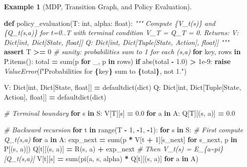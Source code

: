 \documentclass[
]{book}
\newenvironment{Shaded}{\begin{snugshade}}{\end{snugshade}}
\newcommand{\BuiltInTok}[1]{#1}
\newcommand{\CommentTok}[1]{\textcolor[rgb]{0.56,0.35,0.01}{\textit{#1}}}
\newcommand{\ControlFlowTok}[1]{\textcolor[rgb]{0.13,0.29,0.53}{\textbf{#1}}}
\newcommand{\DecValTok}[1]{\textcolor[rgb]{0.00,0.00,0.81}{#1}}
\newcommand{\FloatTok}[1]{\textcolor[rgb]{0.00,0.00,0.81}{#1}}
\newcommand{\KeywordTok}[1]{\textcolor[rgb]{0.13,0.29,0.53}{\textbf{#1}}}
\newcommand{\NormalTok}[1]{#1}
\newcommand{\OperatorTok}[1]{\textcolor[rgb]{0.81,0.36,0.00}{\textbf{#1}}}
\newcommand{\PreprocessorTok}[1]{\textcolor[rgb]{0.56,0.35,0.01}{\textit{#1}}}
\newcommand{\SpecialCharTok}[1]{\textcolor[rgb]{0.81,0.36,0.00}{\textbf{#1}}}
\newcommand{\SpecialStringTok}[1]{\textcolor[rgb]{0.31,0.60,0.02}{#1}}
\theoremstyle{definition}
\theoremstyle{definition}
\newtheorem{example}{Example}[chapter]
\theoremstyle{definition}
\theoremstyle{definition}
\theoremstyle{remark}
\begin{document}
\begin{example}[MDP, Transition Graph, and Policy Evaluation]
\begin{Shaded}
\begin{Highlighting}[]
\KeywordTok{def}\NormalTok{ policy\_evaluation(T: }\BuiltInTok{int}\NormalTok{, alpha: }\BuiltInTok{float}\NormalTok{):}
    \CommentTok{"""}
\CommentTok{    Compute \{V\_t(s)\} and \{Q\_t(s,a)\} for t=0..T with terminal condition V\_T = Q\_T = 0.}
\CommentTok{    Returns:}
\CommentTok{        V: Dict[int, Dict[State, float]]}
\CommentTok{        Q: Dict[int, Dict[Tuple[State, Action], float]]}
\CommentTok{    """}
    \ControlFlowTok{assert}\NormalTok{ T }\OperatorTok{\textgreater{}=} \DecValTok{0}
    \CommentTok{\# sanity: probabilities sum to 1 for each (s,a)}
    \ControlFlowTok{for}\NormalTok{ key, rows }\KeywordTok{in}\NormalTok{ P.items():}
\NormalTok{        total }\OperatorTok{=} \BuiltInTok{sum}\NormalTok{(p }\ControlFlowTok{for}\NormalTok{ \_, p }\KeywordTok{in}\NormalTok{ rows)}
        \ControlFlowTok{if} \BuiltInTok{abs}\NormalTok{(total }\OperatorTok{{-}} \FloatTok{1.0}\NormalTok{) }\OperatorTok{\textgreater{}} \FloatTok{1e{-}9}\NormalTok{:}
            \ControlFlowTok{raise} \PreprocessorTok{ValueError}\NormalTok{(}\SpecialStringTok{f"Probabilities for }\SpecialCharTok{\{}\NormalTok{key}\SpecialCharTok{\}}\SpecialStringTok{ sum to }\SpecialCharTok{\{}\NormalTok{total}\SpecialCharTok{\}}\SpecialStringTok{, not 1."}\NormalTok{)}

\NormalTok{    V: Dict[}\BuiltInTok{int}\NormalTok{, Dict[State, }\BuiltInTok{float}\NormalTok{]] }\OperatorTok{=}\NormalTok{ defaultdict(}\BuiltInTok{dict}\NormalTok{)}
\NormalTok{    Q: Dict[}\BuiltInTok{int}\NormalTok{, Dict[Tuple[State, Action], }\BuiltInTok{float}\NormalTok{]] }\OperatorTok{=}\NormalTok{ defaultdict(}\BuiltInTok{dict}\NormalTok{)}

    \CommentTok{\# Terminal boundary}
    \ControlFlowTok{for}\NormalTok{ s }\KeywordTok{in}\NormalTok{ S:}
\NormalTok{        V[T][s] }\OperatorTok{=} \FloatTok{0.0}
        \ControlFlowTok{for}\NormalTok{ a }\KeywordTok{in}\NormalTok{ A:}
\NormalTok{            Q[T][(s, a)] }\OperatorTok{=} \FloatTok{0.0}

    \CommentTok{\# Backward recursion}
    \ControlFlowTok{for}\NormalTok{ t }\KeywordTok{in} \BuiltInTok{range}\NormalTok{(T }\OperatorTok{{-}} \DecValTok{1}\NormalTok{, }\OperatorTok{{-}}\DecValTok{1}\NormalTok{, }\OperatorTok{{-}}\DecValTok{1}\NormalTok{):}
        \ControlFlowTok{for}\NormalTok{ s }\KeywordTok{in}\NormalTok{ S:}
            \CommentTok{\# First compute Q\_t(s,a)}
            \ControlFlowTok{for}\NormalTok{ a }\KeywordTok{in}\NormalTok{ A:}
\NormalTok{                exp\_next }\OperatorTok{=} \BuiltInTok{sum}\NormalTok{(p }\OperatorTok{*}\NormalTok{ V[t }\OperatorTok{+} \DecValTok{1}\NormalTok{][s\_next] }\ControlFlowTok{for}\NormalTok{ s\_next, p }\KeywordTok{in}\NormalTok{ P[(s, a)])}
\NormalTok{                Q[t][(s, a)] }\OperatorTok{=}\NormalTok{ R(s, a) }\OperatorTok{+}\NormalTok{ exp\_next}
            \CommentTok{\# Then V\_t(s) = E\_\{a\textasciitilde{}pi\}[Q\_t(s,a)]}
\NormalTok{            V[t][s] }\OperatorTok{=} \BuiltInTok{sum}\NormalTok{(pi(a, s, alpha) }\OperatorTok{*}\NormalTok{ Q[t][(s, a)] }\ControlFlowTok{for}\NormalTok{ a }\KeywordTok{in}\NormalTok{ A)}


\end{Highlighting}
\end{Shaded}
\end{example}
\end{document}
